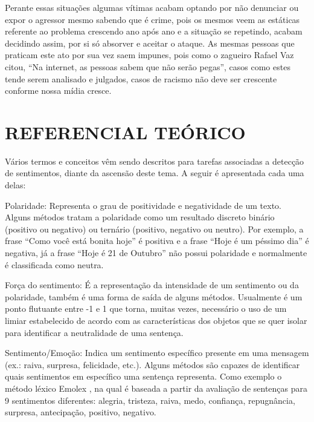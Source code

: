 \documentclass[12pt, a4paper]{article}
\begin{document}
\hspace*{0.8cm}Perante essas situações algumas vítimas acabam optando por não denunciar ou expor o agressor mesmo sabendo que é crime, pois os mesmos veem as estáticas referente ao problema crescendo ano após ano e a situação se repetindo, acabam decidindo assim, por si só absorver e aceitar o ataque.
As mesmas pessoas que praticam este ato por sua vez saem impunes, pois como o zagueiro Rafael Vaz citou, “Na internet, as pessoas sabem que não serão pegas”, casos como estes tende serem analisado e julgados, casos de racismo não deve ser crescente conforme nossa mídia cresce.

\newpage
\section{REFERENCIAL TEÓRICO}	


\hspace*{0.8cm}Vários termos e conceitos vêm sendo descritos para tarefas associadas a detecção de sentimentos, diante da ascensão deste tema. A seguir é apresentada cada uma delas: 

Polaridade: Representa o grau de positividade e negatividade de um texto. Alguns métodos tratam a polaridade como um resultado discreto binário (positivo ou negativo) ou ternário (positivo, negativo ou neutro). Por exemplo, a frase “Como você está bonita hoje” é positiva e a frase “Hoje é um péssimo dia” é negativa, já a frase “Hoje é 21 de Outubro” não possui polaridade e normalmente é classificada como neutra.

Força do sentimento: É a representação da intensidade de um sentimento ou da polaridade, também é uma forma de saída de alguns métodos. Usualmente é um ponto flutuante entre -1 e 1 que torna, muitas vezes, necessário o uso de um limiar estabelecido de acordo com as características dos objetos que se quer isolar para identificar a neutralidade de uma sentença.

Sentimento/Emoção: Indica um sentimento específico presente em uma mensagem (ex.: raiva, surpresa, felicidade, etc.). Alguns métodos são capazes de identificar quais sentimentos em específico uma sentença representa. Como exemplo o método léxico Emolex \cite{Mohammad}, na qual é baseada a partir da avaliação de sentenças para 9 sentimentos diferentes: alegria, tristeza, raiva, medo, confiança, repugnância, surpresa, antecipação, positivo, negativo.
\end{document}
